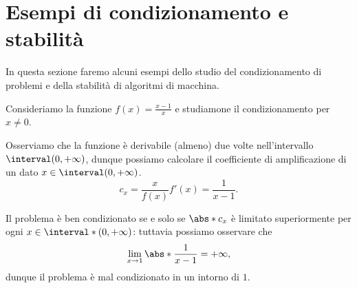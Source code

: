 \section{Esempi di condizionamento e stabilità}

In questa sezione faremo alcuni esempi dello studio del condizionamento di problemi e della stabilità di algoritmi di macchina.

\begin{example}
    Consideriamo la funzione $f(x) = \frac{x-1}{x}$ e studiamone il condizionamento per $x \neq 0$.

    Osserviamo che la funzione è derivabile (almeno) due volte nell'intervallo $\interval({0, +\infty})$, dunque possiamo calcolare il coefficiente di amplificazione di un dato $x \in \interval({0, +\infty})$. \[
        c_x = \frac{x}{f(x)}f'(x) = \frac{1}{x-1}.
    \]  

    Il problema è ben condizionato se e solo se $\abs*{c_x}$ è limitato superiormente per ogni $x \in \interval*({0, +\infty})$: tuttavia possiamo osservare che \[
        \lim_{x \to 1} \abs*{\frac1{x-1}} = +\infty,
    \] dunque il problema è mal condizionato in un intorno di $1$.
\end{example}

